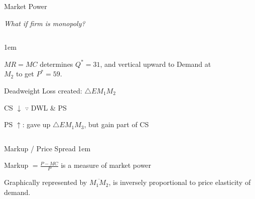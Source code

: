\documentclass[11pt,aspectratio=43,usenames,dvipsnames]{beamer}
\let\olditemize=\itemize
\let\endolditemize=\enditemize
\renewenvironment{itemize}{\olditemize \itemsep1em}{\endolditemize}
\theoremstyle{definition}
\begin{document}
\begin{frame}{Market Power}
\label{slide:Market_Power}
    \begin{center}
        \textit{What if firm is monopoly?}
    \end{center}
    \begin{columns}
        \begin{column}{0.4\textwidth}
            \begin{itemize}
                \item $ MR = MC $ determines $ Q^{*} = 31 $, and vertical upward to Demand at $ M_{2} $ to get $ P^{*} = 59 $.
                \item Deadweight Loss created: $ \triangle EM_{1}M_{2} $
                \item CS $ \downarrow$ $\because$ DWL \& PS
                \item PS $ \uparrow  $: gave up $ \triangle EM_{1}M_{3} $, but gain part of CS
            \end{itemize}

        \end{column}
        \begin{column}{0.6\textwidth}
        \begin{figure}
            \centering
            
        \end{figure}
        \end{column}
    \end{columns}

\end{frame}

\begin{frame}{Markup / Price Spread}
\label{slide:Markup___Price_Spread}
    \begin{itemize}
        \item Markup $ = \frac{P - MC}{P} $ is a measure of market power
        \item Graphically represented by $ \overline{M_{1}M_{2}} $, is inversely proportional to price elasticity of demand.
    \end{itemize}

    \begin{columns}
        \begin{column}{0.5\textwidth}
            \begin{figure}
                \centering
                
            \end{figure}
        \end{column}
        \begin{column}{0.5\textwidth}
            \begin{figure}
                \centering
                
            \end{figure}
        \end{column}
    \end{columns}

\end{frame}
\end{document}
